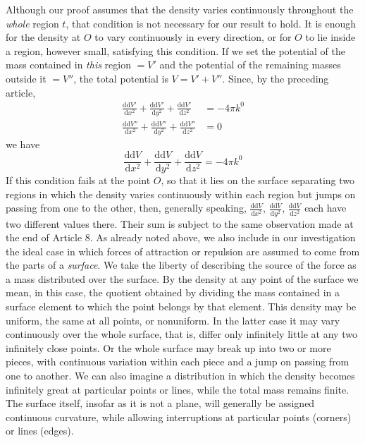 Although our proof assumes that the density varies continuously throughout the \textit{whole} region $t$, that condition is not necessary for our result to hold. It is enough for the density at $O$ to vary continuously in every direction, or for $O$ to lie inside a region, however small, satisfying this condition. If we set the potential of the mass contained in \textit{this} region $=V'$ and the potential of the remaining masses outside it $=V''$, the total potential is $V=V'+V''$. Since, by the preceding article,
\[
\begin{aligned}
\frac{\mathrm{d}\mathrm{d}V'}{\mathrm{d}x^2}+\frac{\mathrm{d}\mathrm{d}V'}{\mathrm{d}y^2}+\frac{\mathrm{d}\mathrm{d}V'}{\mathrm{d}z^2}&=-4\pi k^0\\
\frac{\mathrm{d}\mathrm{d}V''}{\mathrm{d}x^2}+\frac{\mathrm{d}\mathrm{d}V''}{\mathrm{d}y^2}+\frac{\mathrm{d}\mathrm{d}V''}{\mathrm{d}z^2}&=0
\end{aligned}
\]
we have
\[
\frac{\mathrm{d}\mathrm{d}V}{\mathrm{d}x^2}+\frac{\mathrm{d}\mathrm{d}V}{\mathrm{d}y^2}+\frac{\mathrm{d}\mathrm{d}V}{\mathrm{d}z^2}=-4\pi k^0
\]
If this condition fails at the point $O$, so that it lies on the surface separating two regions in which the density varies continuously within each region but jumps on passing from one to the other, then, generally speaking, $\frac{\mathrm{d}\mathrm{d}V}{\mathrm{d}x^2}$, $\frac{\mathrm{d}\mathrm{d}V}{\mathrm{d}y^2}$, $\frac{\mathrm{d}\mathrm{d}V}{\mathrm{d}z^2}$ each have two different values there. Their sum is subject to the same observation made at the end of Article 8.
%
As already noted above, we also include in our investigation the ideal case in which forces of attraction or repulsion are assumed to come from the parts of a \textit{surface}. We take the liberty of describing the source of the force as a mass distributed over the surface. By the density at any point of the surface we mean, in this case, the quotient obtained by dividing the mass contained in a surface element to which the point belongs by that element. This density may be uniform, the same at all points, or nonuniform. In the latter case it may vary continuously over the whole surface, that is, differ only infinitely little at any two infinitely close points. Or the whole surface may break up into two or more pieces, with continuous variation within each piece and a jump on passing from one to another. We can also imagine a distribution in which the density becomes infinitely great at particular points or lines, while the total mass remains finite. The surface itself, insofar as it is not a plane, will generally be assigned continuous curvature, while allowing interruptions at particular points (corners) or lines (edges).

